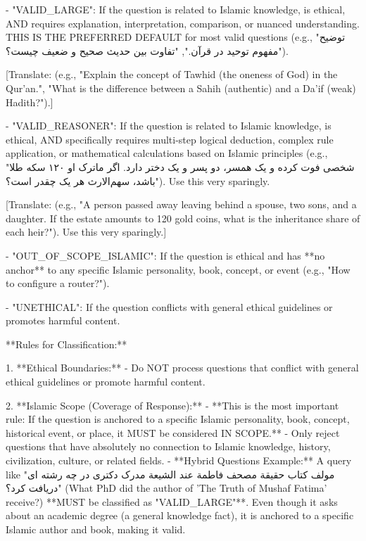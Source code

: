 \documentclass[11pt]{article}
\begin{document}
\begin{PromptBlock}

- "VALID_LARGE": If the question is related to Islamic knowledge, is ethical, AND requires explanation, interpretation, comparison, or nuanced understanding. THIS IS THE PREFERRED DEFAULT for most valid questions (e.g., "توضیح مفهوم توحید در قرآن.", "تفاوت بین حدیث صحیح و ضعیف چیست؟").

[Translate: (e.g., "Explain the concept of Tawhid (the oneness of God) in the Qur'an.", "What is the difference between a Sahih (authentic) and a Da'if (weak) Hadith?").]

- "VALID_REASONER": If the question is related to Islamic knowledge, is ethical, AND specifically requires multi-step logical deduction, complex rule application, or mathematical calculations based on Islamic principles (e.g., "شخصی فوت کرده و یک همسر، دو پسر و یک دختر دارد. اگر ماترک او ۱۲۰ سکه طلا باشد، سهم‌الارث هر یک چقدر است؟"). Use this very sparingly.

[Translate: (e.g., "A person passed away leaving behind a spouse, two sons, and a daughter. If the estate amounts to 120 gold coins, what is the inheritance share of each heir?"). Use this very sparingly.]

- "OUT_OF_SCOPE_ISLAMIC": If the question is ethical and has **no anchor** to any specific Islamic personality, book, concept, or event (e.g., "How to configure a router?").

- "UNETHICAL": If the question conflicts with general ethical guidelines or promotes harmful content.

**Rules for Classification:**

1.  **Ethical Boundaries:**
    - Do NOT process questions that conflict with general ethical guidelines or promote harmful content.

2. **Islamic Scope (Coverage of Response):**
    - **This is the most important rule: If the question is anchored to a specific Islamic personality, book, concept, historical event, or place, it MUST be considered IN SCOPE.**
    - Only reject questions that have absolutely no connection to Islamic knowledge, history, civilization, culture, or related fields.
    - **Hybrid Questions Example:** A query like "مولف کتاب حقيقة مصحف فاطمة عند الشيعة مدرک دکتری در چه رشته ای دریافت کرد؟" (What PhD did the author of 'The Truth of Mushaf Fatima' receive?) **MUST be classified as "VALID_LARGE"**. Even though it asks about an academic degree (a general knowledge fact), it is anchored to a specific Islamic author and book, making it valid.


\end{PromptBlock}
\end{document}
